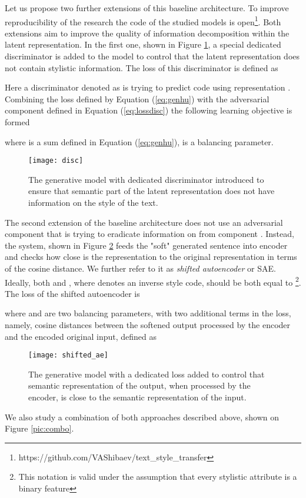 \documentclass[11pt,a4paper]{article}
\begin{document}
Let us propose two further extensions of this baseline architecture. To improve reproducibility of the research the code of the studied models is open\footnote{https://github.com/VAShibaev/text\_style\_transfer}. Both extensions aim to improve the quality of information decomposition within the latent representation. In the first one, shown in Figure \ref{pic:d}, a special dedicated discriminator is added to the model to control that the latent representation does not contain stylistic information. The loss of this discriminator is defined as


Here a discriminator denoted as  is trying to predict code  using representation . Combining the loss defined by Equation (\ref{eq:genhu}) with the adversarial component defined in Equation (\ref{eq:lossdisc}) the following learning objective is formed

where  is a sum defined in Equation (\ref{eq:genhu}),  is a balancing parameter.

\begin{figure}[ht]
\begin{center}
\centerline{\texttt{[image: disc]}}
\caption{The generative model with dedicated discriminator introduced to ensure that semantic part of the latent representation does not have information on the style of the text.}
\label{pic:d}
\end{center}
\end{figure}

The second extension of the baseline architecture does not use an adversarial component  that is trying to eradicate information on  from component . Instead, the system, shown in Figure \ref{pic:sae} feeds the "soft" generated sentence  into encoder  and checks how close is the representation  to the original representation  in terms of the cosine distance. We further refer to it as {\em shifted autoencoder} or SAE. Ideally, both  and , where  denotes an inverse style code, should be both equal to \footnote{This notation is valid under the assumption that every stylistic attribute is a binary feature}. The loss of the shifted autoencoder is 

where  and  are two balancing parameters, with two additional terms in the loss, namely, cosine distances between the softened output processed by the encoder and the encoded original input, defined as 


\begin{figure}[ht]
\begin{center}
\centerline{\texttt{[image: shifted\_ae]}}
\caption{The generative model with a dedicated loss added to control that semantic representation of the output, when processed by the encoder, is close to the semantic representation of the input.}
\label{pic:sae}
\end{center}
\end{figure}
We also study a combination of both approaches described above, shown on Figure \ref{pic:combo}.
\end{document}
